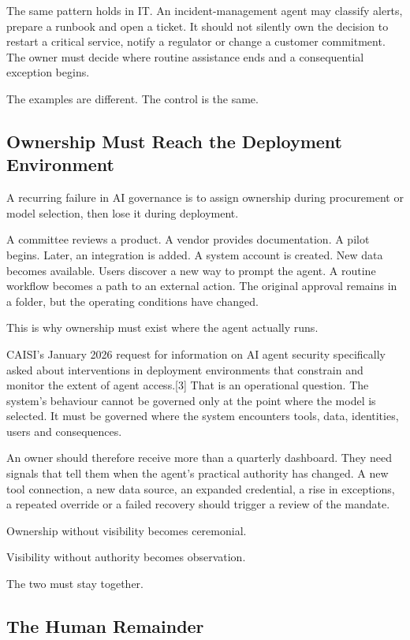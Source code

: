 The same pattern holds in IT. An incident-management agent may classify
alerts, prepare a runbook and open a ticket. It should not silently own
the decision to restart a critical service, notify a regulator or change
a customer commitment. The owner must decide where routine assistance
ends and a consequential exception begins.

The examples are different. The control is the same.

\subsection{Ownership Must Reach the Deployment
Environment}\label{ownership-must-reach-the-deployment-environment}

A recurring failure in AI governance is to assign ownership during
procurement or model selection, then lose it during deployment.

A committee reviews a product. A vendor provides documentation. A pilot
begins. Later, an integration is added. A system account is created. New
data becomes available. Users discover a new way to prompt the agent. A
routine workflow becomes a path to an external action. The original
approval remains in a folder, but the operating conditions have changed.

This is why ownership must exist where the agent actually runs.

CAISI's January 2026 request for information on AI agent security
specifically asked about interventions in deployment environments that
constrain and monitor the extent of agent access.{[}3{]} That is an
operational question. The system's behaviour cannot be governed only at
the point where the model is selected. It must be governed where the
system encounters tools, data, identities, users and consequences.

An owner should therefore receive more than a quarterly dashboard. They
need signals that tell them when the agent's practical authority has
changed. A new tool connection, a new data source, an expanded
credential, a rise in exceptions, a repeated override or a failed
recovery should trigger a review of the mandate.

Ownership without visibility becomes ceremonial.

Visibility without authority becomes observation.

The two must stay together.

\subsection{The Human Remainder}\label{the-human-remainder}


